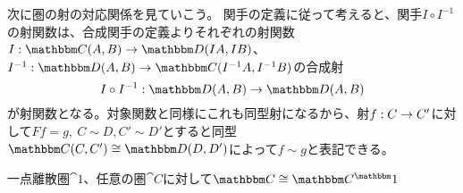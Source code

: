   次に圏の射の対応関係を見ていこう。
  関手の定義に従って考えると、関手$I\circ I^{-1}$の射関数は、合成関手の定義よりそれぞれの射関数$\mor{I}{\arset{C}{A}{B}}{\arset{D}{IA}{IB}}$、$\mor{I^{-1}}{\arset{D}{A}{B}}{\arset{C}{I^{-1}A}{I^{-1}B}}$の合成射
  \[\mor{I\circ I^{-1}}{\arset{D}{A}{B}}{\arset{D}{A}{B}}\]が射関数となる。対象関数と同様にこれも同型射になるから、射$f:C\rightarrow C'$に対して$Ff=g,\ C\sim D, C'\sim D'$とすると同型$\arset{C}{C}{C'}\cong\arset{D}{D}{D'}$によって$f\sim g$と表記できる。
  \begin{center}
  \end{center}  
  \begin{prop}[圏の元]
    一点離散圏$\cat{1}$、任意の圏$\cat{C}$に対して$\cat{C}\cong\funccat{1}{C}$
  \end{prop}
